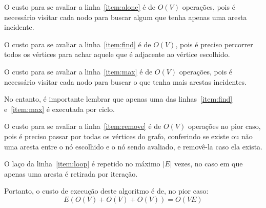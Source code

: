 O custo para se avaliar a linha~\ref{item:alone} é de $O(V)$
operações, pois é necessário visitar cada nodo para buscar algum que
tenha apenas uma aresta incidente.

O custo para se avaliar a linha~\ref{item:find} é de $O(V)$, pois é
preciso percorrer todos os vértices para achar aquele que é adjacente
ao vértice escolhido.

O custo para se avaliar a linha~\ref{item:max} é de $O(V)$
operações, pois é necessário visitar cada nodo para buscar o que tenha
mais arestas incidentes.

No entanto, é importante lembrar que apenas uma das
linhas~\ref{item:find} e~\ref{item:max} é executada por ciclo.

O custo para se avaliar a linha~\ref{item:remove} é de $O(V)$
operações no pior caso, pois é preciso passar por todas os vértices do
grafo, conferindo se existe ou não uma aresta entre o nó escolhido e
o nó sendo avaliado, e removê-la caso ela exista.

O laço da linha~\ref{item:loop} é repetido no máximo $\left| E
\right|$ vezes, no caso em que apenas uma aresta é retirada por
iteração.

Portanto, o custo de execução deste algoritmo é de, no pior caso:
$$E(O(V) + O(V) + O(V)) = O(VE)$$
